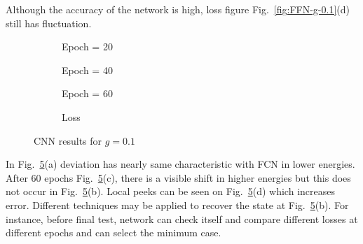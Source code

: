 \documentclass[a4paper,times,12pt]{article}
\begin{document}
Although the accuracy of the network is high, loss figure Fig.~\ref{fig:FFN-g-0.1}(d) still has fluctuation.

\begin{figure}[H]
    \centering
    \begin{subfigure}[t]{0.45\textwidth}
		\centering
        
        \caption{Epoch = 20}
		\label{fig:a}
    \end{subfigure}
    \begin{subfigure}[t]{0.45\textwidth}
		\centering
        
        \caption{Epoch = 40}
		\label{fig:b}
    \end{subfigure}    
    \begin{subfigure}[t]{0.45\textwidth}
        \centering
        
        \caption{Epoch = 60}
		\label{fig:c}
    \end{subfigure}
    \begin{subfigure}[t]{0.45\textwidth}
        \centering
        
        \caption{Loss}
		\label{fig:c}
    \end{subfigure}
	\caption{CNN results for $g = 0.1$}
\label{fig:CNN-g-0.1}
\end{figure}

In Fig.~\ref{fig:CNN-g-0.1}(a) deviation has nearly same characteristic with FCN in lower energies. After 60 epochs Fig.~\ref{fig:CNN-g-0.1}(c), there is a visible shift in higher energies but this does not occur in Fig.~\ref{fig:CNN-g-0.1}(b). Local peeks can be seen on Fig.~\ref{fig:CNN-g-0.1}(d) which increases error. Different techniques may be applied to recover the state at Fig.~\ref{fig:CNN-g-0.1}(b). For instance, before final test, network can check itself and compare different losses at different epochs and can select the minimum case. 
\end{document}
